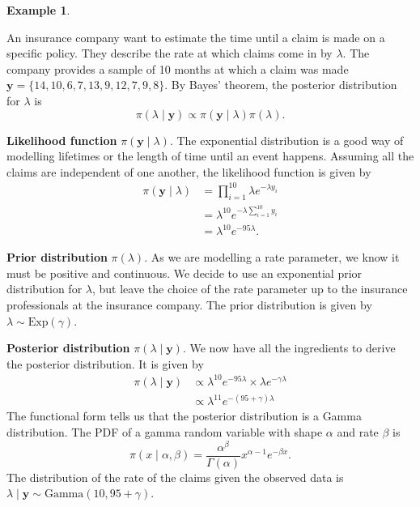 \documentclass[
]{book}
\theoremstyle{definition}
\theoremstyle{definition}
\newtheorem{example}{Example}[chapter]
\theoremstyle{definition}
\theoremstyle{definition}
\theoremstyle{remark}
\begin{document}
\begin{example}
\protect\hypertarget{exm:exponential}{}\label{exm:exponential}

An insurance company want to estimate the time until a claim is made on a specific policy. They describe the rate at which claims come in by \(\lambda\). The company provides a sample of 10 months at which a claim was made \(\boldsymbol{y} = \{14, 10, 6, 7, 13, 9, 12, 7, 9, 8\}\). By Bayes' theorem, the posterior distribution for \(\lambda\) is
\[
\pi(\lambda \mid \boldsymbol{y}) \propto \pi(\boldsymbol{y} \mid \lambda) \pi(\lambda).
\]

\textbf{Likelihood function} \(\pi(\boldsymbol{y} \mid \lambda)\). The exponential distribution is a good way of modelling lifetimes or the length of time until an event happens. Assuming all the claims are independent of one another, the likelihood function is given by
\begin{align*}
\pi(\boldsymbol{y} \mid \lambda) &= \prod_{i=1}^{10} \lambda e^{-\lambda y_i} \\
& = \lambda^{10}e^{-\lambda \sum_{i=1}^{10} y_i} \\
& = \lambda^{10} e^{-95\lambda}.
\end{align*}

\textbf{Prior distribution} \(\pi(\lambda)\). As we are modelling a rate parameter, we know it must be positive and continuous. We decide to use an exponential prior distribution for \(\lambda\), but leave the choice of the rate parameter up to the insurance professionals at the insurance company. The prior distribution is given by \(\lambda \sim \textrm{Exp}(\gamma).\)

\textbf{Posterior distribution} \(\pi(\lambda \mid \boldsymbol{y})\). We now have all the ingredients to derive the posterior distribution. It is given by
\begin{align*}
\pi(\lambda \mid \boldsymbol{y}) &\propto \lambda^{10} e^{-95\lambda} \times \lambda e^{-\gamma\lambda} \\
& \propto \lambda^{11}e^{-(95 + \gamma)\lambda}
\end{align*}
The functional form tells us that the posterior distribution is a Gamma distribution. The PDF of a gamma random variable with shape \(\alpha\) and rate \(\beta\) is
\[
\pi(x \mid \alpha, \beta) = \frac{\alpha^\beta}{\Gamma(\alpha)}x^{\alpha-1}e^{-\beta x}.
\]
The distribution of the rate of the claims given the observed data is \(\lambda \mid \boldsymbol{y} \sim \textrm{Gamma}(10, 95 + \gamma)\).


\end{example}
\end{document}
